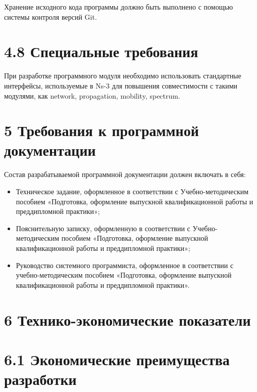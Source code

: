Хранение исходного кода программы должно быть выполнено с помощью
системы контроля версий Git.

\section{4.8 Специальные
требования}\label{ux441ux43fux435ux446ux438ux430ux43bux44cux43dux44bux435-ux442ux440ux435ux431ux43eux432ux430ux43dux438ux44f}

При разработке программного модуля необходимо использовать стандартные
интерфейсы, используемые в Ns-3 для повышения совместимости с такими
модулями, как network, propagation, mobility, spectrum.

\section{5 Требования к программной
документации}\label{ux442ux440ux435ux431ux43eux432ux430ux43dux438ux44f-ux43a-ux43fux440ux43eux433ux440ux430ux43cux43cux43dux43eux439-ux434ux43eux43aux443ux43cux435ux43dux442ux430ux446ux438ux438}

Состав разрабатываемой программной документации должен включать в себя:

\begin{itemize}
\item
  Техническое задание, оформленное в соответствии с Учебно-методическим
  пособием «Подготовка, оформление выпускной квалификационной работы и
  преддипломной практики»;
\item
  Пояснительную записку, оформленную в соответствии с
  Учебно-методическим пособием «Подготовка, оформление выпускной
  квалификационной работы и преддипломной практики»;
\item
  Руководство системного программиста, оформленное в соответствии с
  учебно-методическим пособием «Подготовка, оформление выпускной
  квалификационной работы и преддипломной практики».
\end{itemize}

\section{6 Технико-экономические
показатели}\label{ux442ux435ux445ux43dux438ux43aux43e-ux44dux43aux43eux43dux43eux43cux438ux447ux435ux441ux43aux438ux435-ux43fux43eux43aux430ux437ux430ux442ux435ux43bux438}

\section{6.1 Экономические преимущества
разработки}\label{ux44dux43aux43eux43dux43eux43cux438ux447ux435ux441ux43aux438ux435-ux43fux440ux435ux438ux43cux443ux449ux435ux441ux442ux432ux430-ux440ux430ux437ux440ux430ux431ux43eux442ux43aux438}

